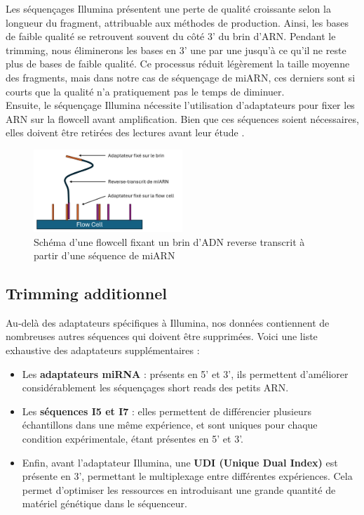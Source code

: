 Les séquençages Illumina présentent une perte de qualité croissante selon la longueur du fragment, attribuable aux méthodes de production. Ainsi, les bases de faible qualité se retrouvent souvent du côté 3’ du brin d'ARN. Pendant le trimming, nous éliminerons les bases en 3’ une par une jusqu'à ce qu'il ne reste plus de bases de faible qualité. Ce processus réduit légèrement la taille moyenne des fragments, mais dans notre cas de séquençage de miARN, ces derniers sont si courts que la qualité n'a pratiquement pas le temps de diminuer.\\

Ensuite, le séquençage Illumina nécessite l'utilisation d'adaptateurs pour fixer les ARN sur la flowcell avant amplification. Bien que ces séquences soient nécessaires, elles doivent être retirées des lectures avant leur étude \cite{illumina}. 

\begin{figure}
    \centering
    \includegraphics[width=0.5\textwidth]{img/flowcell.PNG}
    \caption{Schéma d'une flowcell fixant un brin d'ADN reverse transcrit à partir d'une séquence de miARN}
    \label{fig:flowcell}
\end{figure}

\subsection*{Trimming additionnel}
\noindent Au-delà des adaptateurs spécifiques à Illumina, nos données contiennent de nombreuses autres séquences qui doivent être supprimées. Voici une liste exhaustive des adaptateurs supplémentaires :

\begin{itemize}
    \item Les \textbf{adaptateurs miRNA} : présents en 5’ et 3’, ils permettent d'améliorer considérablement les séquençages short reads des petits ARN.
    \item Les \textbf{séquences I5 et I7} : elles permettent de différencier plusieurs échantillons dans une même expérience, et sont uniques pour chaque condition expérimentale, étant présentes en 5’ et 3’.
    \item Enfin, avant l'adaptateur Illumina, une \textbf{UDI (Unique Dual Index)} est présente en 3’, permettant le multiplexage entre différentes expériences. Cela permet d'optimiser les ressources en introduisant une grande quantité de matériel génétique dans le séquenceur.
\end{itemize}

